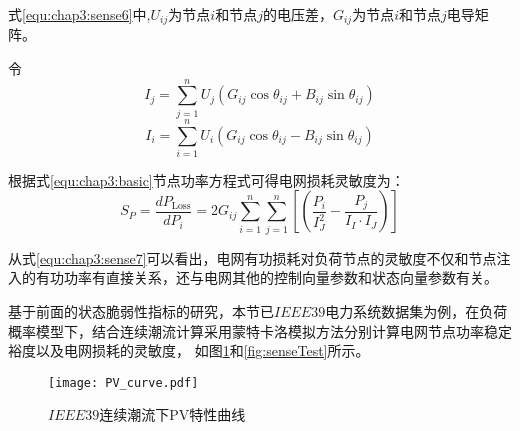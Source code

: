 式\ref{equ:chap3:sense6}中,$U_{ij}$为节点$i$和节点$j$的电压差，$G_{ij}$为节点$i$和节点$j$电导矩阵。

令$$I_j = \sum_{j=1}^{n} U_{j}\left(G_{i j} \cos \theta_{i j}+B_{i j} \sin \theta_{i j}\right)$$
$$I_i = \sum_{i=1}^{n} U_{i}\left(G_{i j} \cos \theta_{i j}-B_{i j} \sin \theta_{i j}\right)$$

根据式\ref{equ:chap3:basic}节点功率方程式可得电网损耗灵敏度为：
\begin{equation}
  \label{equ:chap3:sense7}
  S_P = \frac{d P_{\text {Loss}}}{d P_{i}}=2 G_{i j} \sum_{i=1}^{n} \sum_{j=1}^{n}\left[\left(\frac{P_{i}}{I_{J}^{2}}-\frac{P_{j}}{I_{I} \cdot I_{J}}\right)\right]
\end{equation}

从式\ref{equ:chap3:sense7}可以看出，电网有功损耗对负荷节点的灵敏度不仅和节点注入的有功功率有直接关系，还与电网其他的控制向量参数和状态向量参数有关。


基于前面的状态脆弱性指标的研究，本节已$IEEE39$电力系统数据集为例，在负荷概率模型下，结合连续潮流计算采用蒙特卡洛模拟方法分别计算电网节点功率稳定裕度以及电网损耗的灵敏度，
如图\ref{fig:PV_curve}和\ref{fig:senseTest}所示。

  


\begin{figure}[H] 
  \centering
  \texttt{[image: PV\_curve.pdf]}
  \caption{$IEEE39$连续潮流下PV特性曲线}
  \label{fig:PV_curve}
\end{figure}

